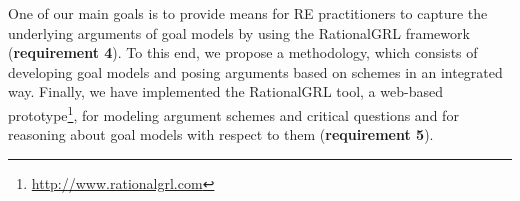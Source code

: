 One of our main goals is to provide means for RE practitioners to capture the underlying arguments of goal models by using the RationalGRL framework (\textbf{requirement 4}). To this end, we propose a methodology, which consists of developing goal models and posing arguments based on schemes in an integrated way. Finally, we have implemented the RationalGRL tool, a web-based prototype\footnote{\url{http://www.rationalgrl.com}}, for modeling argument schemes and critical questions and for reasoning about goal models with respect to them (\textbf{requirement 5}). 